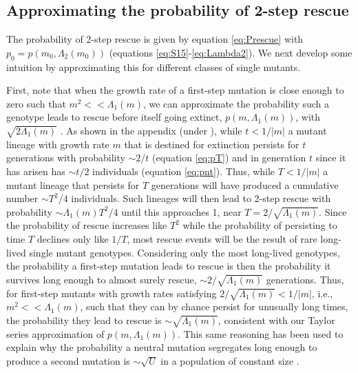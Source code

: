 \documentclass[9pt,twocolumn,twoside,lineno]{gsajnl}
\begin{document}
\subsection{Approximating the probability of 2-step rescue}

The probability of 2-step rescue is given by equation \ref{eq:Prescue} with $p_0=p(m_0,\Lambda_2(m_0))$ (equations \ref{eq:S15}-\ref{eq:Lambda2}).
We next develop some intuition by approximating this for different classes of single mutants.

First, note that when the growth rate of a first-step mutation is close enough to zero such that $m^2 << \Lambda_1(m)$, we can approximate the probability such a genotype leads to rescue before itself going extinct, $p(m,\Lambda_1(m))$, with $\sqrt{2\Lambda_1(m)}$ \citep[c.f.\ equation A.4b in ][]{Iwasa2004}.
As shown in the appendix (under ), while $t<1/|m|$ a mutant lineage with growth rate $m$ that is destined for extinction persists for $t$ generations with probability $\sim2/t$ (equation \ref{eq:pT}) and in generation $t$ since it has arisen has $\sim t/2$ individuals (equation \ref{eq:pnt}). 
Thus, while $T<1/|m|$ a mutant lineage that persists for $T$ generations will have produced a cumulative number $\sim T^2/4$ individuals. 
Such lineages will then lead to 2-step rescue with probability $\sim \Lambda_1(m) T^2/4$ until this approaches 1, near $T=2/\sqrt{\Lambda_1(m)}$.
Since the probability of rescue increases like $T^2$ while the probability of persisting to time $T$ declines only like $1/T$, most rescue events will be the result of rare long-lived single mutant genotypes.
Considering only the most long-lived genotypes, the probability a first-step mutation leads to rescue is then the probability it survives long enough to almost surely rescue, $\sim2/\sqrt{\Lambda_1(m)}$ generations.
Thus, for first-step mutants with growth rates satisfying $2/\sqrt{\Lambda_1(m)} < 1/|m|$, i.e., $m^2 << \Lambda_1(m)$, such that they can by chance persist for unusually long times, the probability they lead to rescue is $\sim\sqrt{\Lambda_1(m)}$, consistent with our Taylor series approximation of $p(m,\Lambda_1(m))$.
This same reasoning has been used to explain why the probability a neutral mutation segregates long enough to produce a second mutation is $\sim\sqrt{U}$ in a population of constant size \citep{Weissman2009}.
\end{document}
